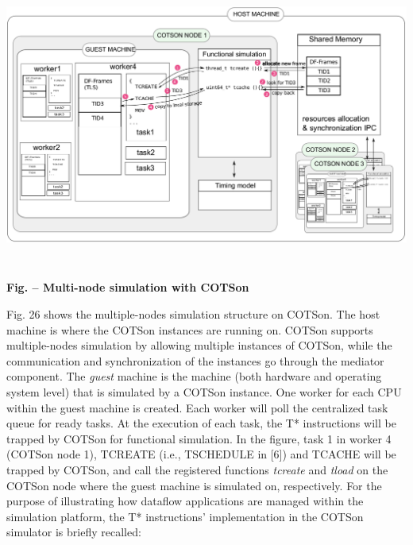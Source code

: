 \documentclass[a4paper]{article}
\newcounter{Figure}
\renewcommand\theFigure{\arabic{Figure}}
\begin{document}
\begin{center}
\begin{minipage}{6.2492in}
{\centering 
\includegraphics[width=6.2736in,height=3.6957in]{img42.png}
\par}

{\centering{}\sffamily\bfseries
\label{bkm:Ref388170757}Fig. \stepcounter{Figure}{\theFigure} --
Multi-node simulation with COTSon
\par}


\bigskip
\end{minipage}
\end{center}
{
Fig. 26 shows the multiple-nodes simulation structure on COTSon. The
host machine is where the COTSon instances are running on. COTSon
supports multiple-nodes simulation by allowing multiple instances of
COTSon, while the communication and synchronization of the instances go
through the mediator component. The \textit{guest} machine is the
machine (both hardware and operating system level) that is simulated by
a COTSon instance. One worker for each CPU within the guest machine is
created. Each worker will poll the centralized task queue for ready
tasks. At the execution of each task, the T* instructions will be
trapped by COTSon for functional simulation. In the figure, task 1 in
worker 4 (COTSon node 1), TCREATE (i.e., TSCHEDULE in [6]) and TCACHE
will be trapped by COTSon, and call the registered functions
\textit{tcreate} and \textit{tload} on the COTSon node where the guest
machine is simulated on, respectively. For the purpose of illustrating
how dataflow applications are managed within the simulation platform,
the T* instructions{\textquoteright} implementation in the COTSon
simulator is briefly recalled:}
\end{document}
